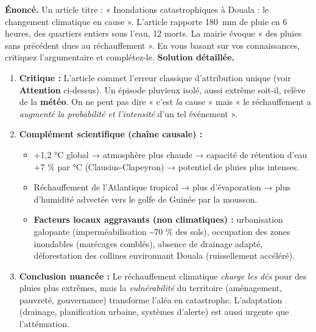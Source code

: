 \documentclass[11pt]{article}
\begin{document}
\begin{exoresolu}
\textbf{Énoncé.} Un article titre : « Inondations catastrophiques à Douala : le changement climatique en cause ». L'article rapporte \SI{180}{\milli\meter} de pluie en 6 heures, des quartiers entiers sous l'eau, 12 morts. La mairie évoque « des pluies sans précédent dues au réchauffement ». En vous basant sur vos connaissances, critiquez l'argumentaire et complétez-le.
\tcblower
\textbf{Solution détaillée.}
\begin{enumerate}
    \item \textbf{Critique :} L'article commet l'erreur classique d'attribution unique (voir \textbf{Attention} ci-dessus). Un épisode pluvieux isolé, aussi extrême soit-il, relève de la \textbf{météo}. On ne peut pas dire « c'est \emph{la} cause » mais « le réchauffement a \emph{augmenté la probabilité et l'intensité} d'un tel événement ».
    \item \textbf{Complément scientifique (chaîne causale) :}
    \begin{itemize}
        \item +1,2 °C global → atmosphère plus chaude → capacité de rétention d'eau +7 \% par °C (Clausius-Clapeyron) → potentiel de pluies plus intenses.
        \item Réchauffement de l'Atlantique tropical → plus d'évaporation → plus d'humidité advectée vers le golfe de Guinée par la mousson.
        \item \textbf{Facteurs locaux aggravants (non climatiques) :} urbanisation galopante (imperméabilisation \textasciitilde 70 \% des sols), occupation des zones inondables (marécages comblés), absence de drainage adapté, déforestation des collines environnant Douala (ruissellement accéléré).
    \end{itemize}
    \item \textbf{Conclusion nuancée :} Le réchauffement climatique \emph{charge les dés} pour des pluies plus extrêmes, mais la \emph{vulnérabilité} du territoire (aménagement, pauvreté, gouvernance) transforme l'aléa en catastrophe. L'adaptation (drainage, planification urbaine, systèmes d'alerte) est aussi urgente que l'atténuation.
\end{enumerate}
\end{exoresolu}
\end{document}
